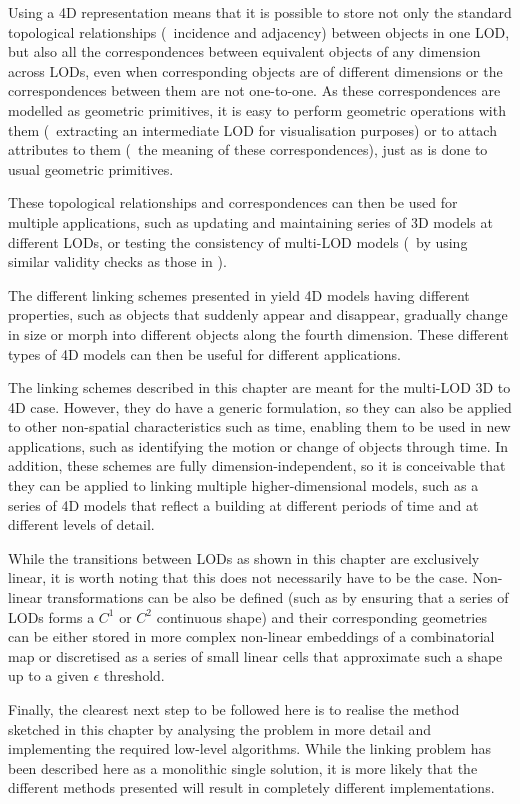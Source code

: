 Using a 4D representation means that it is possible to store not only the standard topological relationships (\eg\ incidence and adjacency) between objects in one LOD, but also all the correspondences between equivalent objects of any dimension across LODs, even when corresponding objects are of different dimensions or the correspondences between them are not one-to-one.
As these correspondences are modelled as geometric primitives, it is easy to perform geometric operations with them (\eg\ extracting an intermediate LOD for visualisation purposes) or to attach attributes to them (\eg\ the meaning of these correspondences), just as is done to usual geometric primitives.

These topological relationships and correspondences can then be used for multiple applications, such as updating and maintaining series of 3D models at different LODs, or testing the consistency of multi-LOD models (\eg\ by using similar validity checks as those in \citet{Groger11}).

The different linking schemes presented in  yield 4D models having different properties, such as objects that suddenly appear and disappear, gradually change in size or morph into different objects along the fourth dimension.
These different types of 4D models can then be useful for different applications.

The linking schemes described in this chapter are meant for the multi-LOD 3D to 4D case.
However, they do have a generic formulation, so they can also be applied to other non-spatial characteristics such as time, enabling them to be used in new applications, such as identifying the motion or change of objects through time.
In addition, these schemes are fully dimension-independent, so it is conceivable that they can be applied to linking multiple higher-dimensional models, such as a series of 4D models that reflect a building at different periods of time and at different levels of detail.

While the transitions between LODs as shown in this chapter are exclusively linear, it is worth noting that this does not necessarily have to be the case.
Non-linear transformations can be also be defined (such as by ensuring that a series of LODs forms a $C^1$ or $C^2$ continuous shape) and their corresponding geometries can be either stored in more complex non-linear embeddings of a combinatorial map or discretised as a series of small linear cells that approximate such a shape up to a given $\epsilon$ threshold.

Finally, the clearest next step to be followed here is to realise the method sketched in this chapter by analysing the problem in more detail and implementing the required low-level algorithms.
While the linking problem has been described here as a monolithic single solution, it is more likely that the different methods presented will result in completely different implementations.
